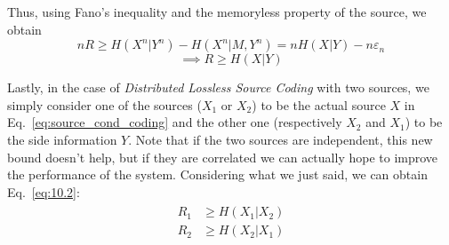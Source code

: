 Thus, using Fano's inequality and the memoryless property of the source, we obtain
%
\begin{equation}
nR \geq H(X^n|Y^n) - H(X^n|M,Y^n) = nH(X|Y) - n\varepsilon_n
\end{equation}
\begin{equation} \label{eq:source_cond_coding}
\implies R \geq H(X|Y)
\end{equation}

Lastly, in the case of \textit{Distributed Lossless Source Coding} with two sources, we simply consider one of the sources ($X_1$ or $X_2$) to be the actual source $X$ in Eq.~\eqref{eq:source_cond_coding} and the other one (respectively $X_2$ and $X_1$) to be the side information $Y$. Note that if the two sources are independent, this new bound doesn't help, but if they are correlated we can actually hope to improve the performance of the system. Considering what we just said, we can obtain Eq.~\eqref{eq:10.2}:
%
\begin{align}
\begin{split}
R_1 &\geq H(X_1|X_2)\\
R_2 &\geq H(X_2|X_1)
\end{split}
\tag{10.2}
\label{eq:10.2}
\end{align}
